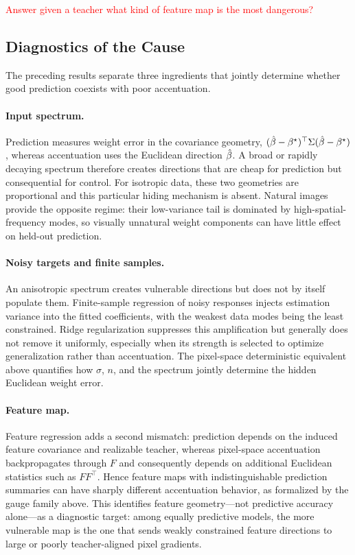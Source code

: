 \documentclass{article}
\newcommand{\red}[1]{\textcolor{red}{#1}}
\theoremstyle{plain}
\theoremstyle{definition}
\begin{document}
\red{Answer given a teacher what kind of feature map is the most dangerous?}

\subsection{Diagnostics of the Cause}

The preceding results separate three ingredients that jointly determine whether good prediction coexists with poor accentuation.

\paragraph{Input spectrum.}
Prediction measures weight error in the covariance geometry, $(\hat{\beta}-{\beta^{\star}})^\top\Sigma(\hat{\beta}-{\beta^{\star}})$, whereas accentuation uses the Euclidean direction $\hat{\beta}$.
A broad or rapidly decaying spectrum therefore creates directions that are cheap for prediction but consequential for control.
For isotropic data, these two geometries are proportional and this particular hiding mechanism is absent.
Natural images provide the opposite regime: their low-variance tail is dominated by high-spatial-frequency modes, so visually unnatural weight components can have little effect on held-out prediction.

\paragraph{Noisy targets and finite samples.}
An anisotropic spectrum creates vulnerable directions but does not by itself populate them.
Finite-sample regression of noisy responses injects estimation variance into the fitted coefficients, with the weakest data modes being the least constrained.
Ridge regularization suppresses this amplification but generally does not remove it uniformly, especially when its strength is selected to optimize generalization rather than accentuation.
The pixel-space deterministic equivalent above quantifies how $\sigma$, $n$, and the spectrum jointly determine the hidden Euclidean weight error.

\paragraph{Feature map.}
Feature regression adds a second mismatch: prediction depends on the induced feature covariance and realizable teacher, whereas pixel-space accentuation backpropagates through $F$ and consequently depends on additional Euclidean statistics such as $FF^\top$.
Hence feature maps with indistinguishable prediction summaries can have sharply different accentuation behavior, as formalized by the gauge family above.
This identifies feature geometry---not predictive accuracy alone---as a diagnostic target: among equally predictive models, the more vulnerable map is the one that sends weakly constrained feature directions to large or poorly teacher-aligned pixel gradients.
\end{document}
